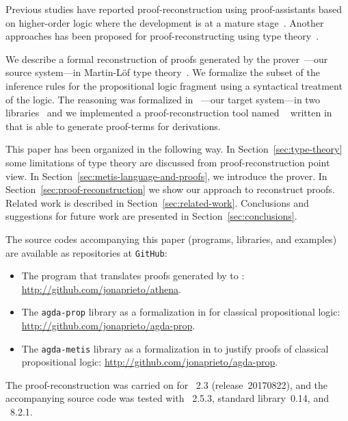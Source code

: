\documentclass[../main.tex]{subfiles}
\begin{document}
Previous studies have reported proof-reconstruction using
proof-assistants based on higher-order logic where the development is
at a mature
stage~\cite{paulson2010three,hurlin07practical,kaliszyk2013}. Another
approaches has been proposed for proof-reconstructing using type
theory~\cite{Bezem2002,armand2011,Ekici2017,kanso2016light}.

We describe a formal reconstruction of proofs generated by the \Metis
prover~\cite{hurd2003first}---our source system---in Martin-Löf type
theory~\cite{Nordstrom-Petersson-Smith-1990}. We
formalize the subset of the \Metis inference rules for the
propositional logic fragment using a syntactical treatment of the
logic. The \Metis reasoning was formalized in
\Agda~\cite{agdateam}---our target system---in two
libraries~\cite{AgdaProp,AgdaMetis} and we implemented a
proof-reconstruction tool named \Athena~\cite{Athena} written in
\Haskell that is able to generate \Agda proof-terms for \Metis
derivations.

This paper has been organized in the following way.
In Section~\ref{sec:type-theory} some limitations of type theory
are discussed from proof-reconstruction point view.
In Section~\ref{sec:metis-language-and-proofs}, we introduce the
\Metis prover.
In Section~\ref{sec:proof-reconstruction} we show our
approach to reconstruct \Metis proofs.
Related work is described in Section~\ref{sec:related-work}.
Conclusions and suggestions for future work are  presented in
Section~\ref{sec:conclusions}.


The source codes accompanying this paper (programs, libraries, and
examples) are available as repositories at \verb!GitHub!:

\begin{itemize}
  \item The \Athena program that translates proofs generated by \Metis to \Agda:
  \url{http://github.com/jonaprieto/athena}.
  \item The \verb!agda-prop! library as a formalization in \Agda for
    classical propositional logic:
  \url{http://github.com/jonaprieto/agda-prop}.
\item The \verb!agda-metis! library as a formalization in \Agda to
  justify \Metis proofs of classical propositional logic:
  \url{http://github.com/jonaprieto/agda-prop}.
\end{itemize}

The proof-reconstruction was carried on for \Metis~2.3
(release~20170822), and the accompanying source code was tested with
\Agda~2.5.3, \Agda standard library~0.14, and ~8.2.1.
\end{document}
